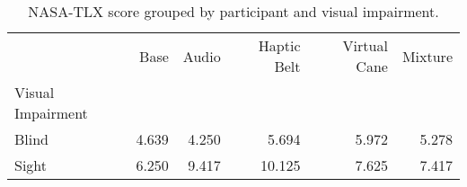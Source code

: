 
\begin{table}[!htb]
\centering
\caption{NASA-TLX score grouped by participant and visual impairment.}
\label{tab:nasa_average_group}
\begin{tabular}{lrrrrr}
\toprule
{} &  Base &  Audio &  Haptic Belt &  Virtual Cane &  Mixture \\
Visual Impairment &       &        &              &               &          \\
\midrule
Blind             & 4.639 &  4.250 &        5.694 &         5.972 &    5.278 \\
Sight             & 6.250 &  9.417 &       10.125 &         7.625 &    7.417 \\
\bottomrule
\end{tabular}
\end{table}

